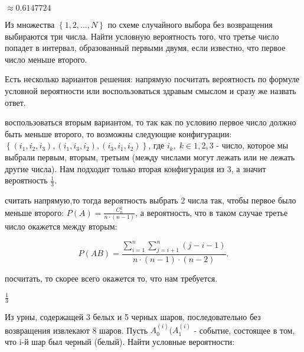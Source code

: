 \begin{result}
  $\approx 0.6147724$
\end{result}

\medskip
\begin{task}{3}
  Из множества $\left\{1, 2, \ldots, N\right\} $ по схеме случайного выбора без возвращения
  выбираются три числа. Найти условную вероятность того, что третье число попадет в интервал,
  образованный первыми двумя, если известно, что первое число меньше второго.
\end{task}

\begin{solution}
Есть несколько вариантов решения: напрямую посчитать вероятность по формуле условной вероятности 
или воспользоваться здравым смыслом и сразу же назвать ответ.

\medskip
{} воспользоваться вторым вариантом, то так как по условию первое 
число должно быть меньше второго, то возможны следующие конфигурации: $\left\{\left(
i_1, i_2, i_3\right) , \left(i_1, i_3, i_2\right) , \left(i_3, i_1, i_2\right) \right\} $, где
$i_k, \; k \in {1, 2, 3}$ - число, которое мы выбрали первым, вторым, третьим (между числами 
могут лежать или не лежать другие числа). Нам подходит только
вторая конфигурация из 3, а значит вероятность $\frac{1}{3}$.
  
\medskip
{} считать напрямую,то тогда вероятность выбрать 2 числа так, чтобы первое было 
меньше второго: $P(A) = \frac{C_{n}^2}{n\cdot (n - 1)}$, а вероятность, что в таком случае 
третье число окажется между вторым: 

\[
  P(AB) = \frac{\sum_{i = 1}^n \sum_{j = i + 1}^n (j - i - 1)}{n\cdot (n - 1) \cdot (n - 2)}
.\] 

 посчитать, то скорее всего окажется то, что нам требуется.
\end{solution}

\begin{result}
  $\frac{1}{3}$
\end{result}

\medskip
\begin{task}{4}
 Из урны, содержащей 3 белых и 5 черных шаров, последовательно без возвращения извлекают 8 шаров. 
 Пусть $A_0^{(i)} (A_1^{(i)}$ - событие, состоящее в том, что i-й шар был черный (белый). Найти 
 условные вероятности:
\end{task}

